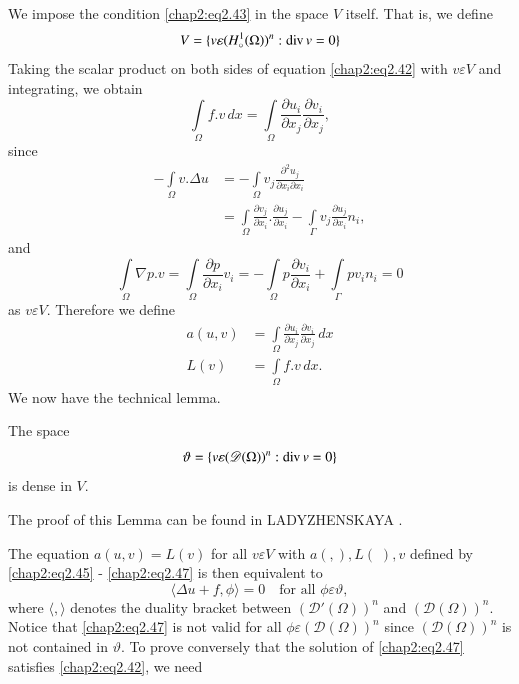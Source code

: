 We impose the condition \eqref{chap2:eq2.43} in the space $V$
itself. That is, we define
\begin{equation}\label{chap2:eq2.45}
V=\{v\varepsilon(H_\circ^1(\Omega))^n:\operatorname{div} v=0\}
\end{equation}
Taking the scalar product on both sides of equation
\eqref{chap2:eq2.42} with $v\varepsilon V$ and integrating, we obtain 
$$
\int\limits_\Omega f.v\,dx=\int\limits_\Omega\frac{\partial u_i}
{\partial x_j}\frac{\partial v_i}{\partial x_j},
$$
since
\begin{align*}
-\int\limits_\Omega v.\Delta u &= -\int\limits_\Omega v_j
\frac{\partial^2u_j}{\partial x_i\partial x_i}\\
&= \int\limits_\Omega\frac{\partial v_j}{\partial x_i}.\frac{\partial
u_j}{\partial x_i}-\int\limits_\Gamma v_j\frac{\partial u_j} {\partial
x_i}n_i,
\end{align*}
and\pageoriginale 
$$
\int\limits_\Omega\nabla p.v=\int\limits_\Omega\frac{\partial p}
{\partial x_i}v_i=-\int\limits_\Omega p\frac{\partial v_i}{\partial
x_i}+\int\limits_\Gamma pv_in_i=0
$$
as $v\varepsilon V$. Therefore we define
\begin{align}
a(u, v) &= \int\limits_\Omega\frac{\partial u_i}{\partial x_j}
\frac{\partial v_i}{\partial x_j}\,dx \label{chap2:eq2.46}\\
L(v) &= \int\limits_\Omega f.v\,dx.\label{chap2:eq2.47}
\end{align}
We now have the technical lemma.
\setcounter{lem}{4}
\begin{lem}\label{chap2:lem5}
The space
$$
\vartheta=\left\{v\varepsilon(\mathscr{D}(\Omega))^n:\operatorname{div} v=0\right\}
$$
is dense in $V$.
\end{lem}
The proof of this Lemma can be found in LADYZHENSKAYA \cite{key27}.

The equation $a(u, v)=L(v)$ for all $v\varepsilon V$ with $a(,),
L(\;), v$ defined by \eqref{chap2:eq2.45} - \eqref{chap2:eq2.47} is
then equivalent to 
\begin{equation*}\label{chap2:eq2.48}
\langle\Delta u+f, \phi \rangle=0\quad\text{for all }\phi\varepsilon\vartheta,
\tag{2.47} 
\end{equation*}
where $\langle , \rangle$ denotes the duality bracket between $(\mathscr{D}'
(\Omega))^n$ and $(\mathscr{D}(\Omega))^n$. Notice that
\eqref{chap2:eq2.47} is not valid for all $\phi\varepsilon
(\mathscr{D}(\Omega))^n$ since $(\mathscr{D}(\Omega))^n$ is not
contained in $\vartheta$. To prove conversely that the solution of
\eqref{chap2:eq2.47} satisfies \eqref{chap2:eq2.42}, we need

